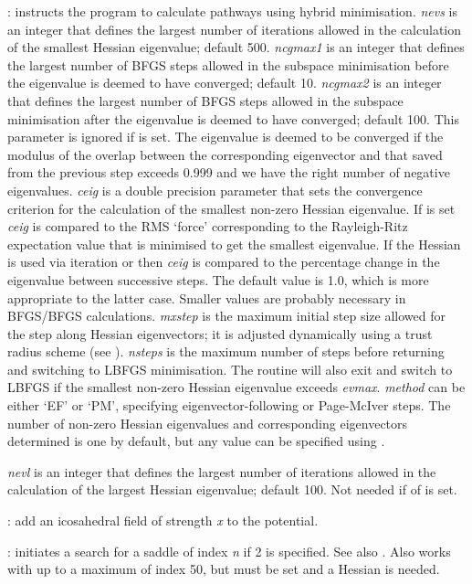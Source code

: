 {{: instructs the 
program to calculate pathways using hybrid minimisation.
{\it nevs\/} is an integer that defines the largest number of iterations allowed in the
calculation of the smallest Hessian eigenvalue; default 500.
{\it ncgmax1\/} is an integer that defines the largest number of BFGS steps
allowed in the subspace minimisation before the eigenvalue is deemed to have converged; default 10.
{\it ncgmax2\/} is an integer that defines the largest number of BFGS steps
allowed in the subspace minimisation after the eigenvalue is deemed to have converged; default 100.
This parameter is ignored if {} is set.
The eigenvalue is deemed to be converged if the modulus of the overlap between the corresponding
eigenvector and that saved from the previous step exceeds 0.999 and we have the right number of
negative eigenvalues.
{\it ceig\/} is a double precision parameter that sets the convergence criterion for
the calculation of the smallest non-zero Hessian eigenvalue.
If {} is set {\it ceig\/} is compared to the RMS `force' corresponding to the
Rayleigh-Ritz expectation value that is minimised to get the smallest eigenvalue.
If the Hessian is used via iteration or {}
then {\it ceig\/} is compared to the percentage change in the eigenvalue between successive
steps. The default value is 1.0, which is more appropriate to the latter case. Smaller
values are probably necessary in BFGS/BFGS calculations.
{\it mxstep\/} is the maximum initial step size allowed for the step along
Hessian eigenvectors; it is adjusted dynamically using a trust radius scheme (see {}).
{\it nsteps\/} is the maximum number of steps before returning and switching to LBFGS
minimisation. 
The routine will also exit and switch to LBFGS if the smallest non-zero Hessian
eigenvalue exceeds {\it evmax\/}.
{\it method\/} can be either `EF' or `PM', specifying eigenvector-following or
Page-McIver steps.
The number of non-zero Hessian eigenvalues and corresponding eigenvectors determined
is one by default, but any value can be specified using {}.

{\it nevl\/} is an integer that defines the largest number of iterations allowed in the
calculation of the largest Hessian eigenvalue; default 100. Not needed if {}
of {} is set. 

: add an icosahedral field of strength {\it x} to the potential.

: initiates a search for a saddle of index {\it n\/} if
       2 is specified. See also {}. Also works with {}
      up to a maximum of index 50, but {} must be set and a Hessian is needed.

}}

